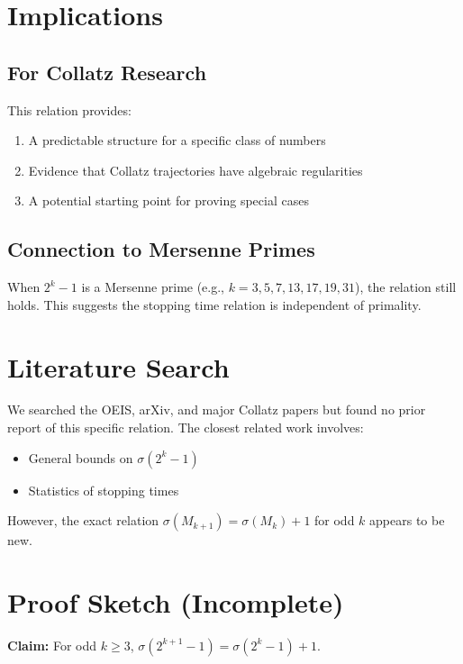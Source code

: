 \documentclass[twocolumn,prl,aps,superscriptaddress]{revtex4-2}
\begin{document}
\section{Implications}

\subsection{For Collatz Research}

This relation provides:
\begin{enumerate}
\item A predictable structure for a specific class of numbers
\item Evidence that Collatz trajectories have algebraic regularities
\item A potential starting point for proving special cases
\end{enumerate}

\subsection{Connection to Mersenne Primes}

When $2^k - 1$ is a Mersenne prime (e.g., $k = 3, 5, 7, 13, 17, 19, 31$), 
the relation still holds. This suggests the stopping time relation is 
independent of primality.

\section{Literature Search}

We searched the OEIS, arXiv, and major Collatz papers but found no prior 
report of this specific relation. The closest related work involves:
\begin{itemize}
\item General bounds on $\sigma(2^k - 1)$ \cite{lagarias}
\item Statistics of stopping times \cite{tao}
\end{itemize}

However, the exact relation $\sigma(M_{k+1}) = \sigma(M_k) + 1$ for odd $k$ 
appears to be new.

\section{Proof Sketch (Incomplete)}

\textbf{Claim:} For odd $k \geq 3$, $\sigma(2^{k+1}-1) = \sigma(2^k-1) + 1$.
\end{document}

